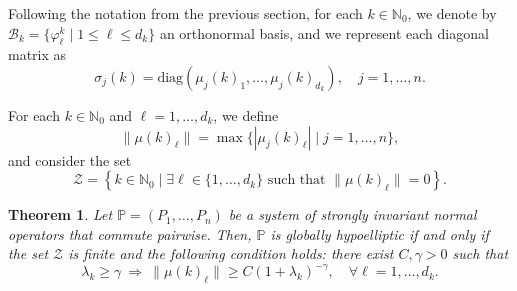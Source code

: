 \documentclass{amsart}
\newtheorem{theorem}{Theorem}[section]
\theoremstyle{definition}
\theoremstyle{remark}
\numberwithin{equation}{section}
\begin{document}
Following the notation from the previous section, for each $k\in\mathbb{N}_0$, we denote by $\mathcal{B}_k=\{\varphi_\ell^{k} \mid 1\leq \ell \leq d_k\}$ an orthonormal basis, and we represent each diagonal matrix as  
\begin{equation*}
	\sigma_j(k)= \text{diag}(\mu_j(k)_1,\dots,\mu_j(k)_{d_k}), \quad j=1,\ldots, n.
\end{equation*}

For each $k\in\mathbb{N}_0$ and $\ell=1,\dots,d_k$, we define  
\begin{equation*}
	\|\mu(k)_\ell\|=\max\{|\mu_j(k)_\ell| \mid j=1,\dots,n\},
\end{equation*}
and consider the set  
\begin{equation*}
	\mathcal{Z}=\left\{k\in\mathbb{N}_0 \mid \exists \ell\in\{1,\dots,d_k\} \text{ such that } \|\mu(k)_\ell\|=0\right\}.
\end{equation*}

	
	\begin{theorem}
		Let $\mathbb{P}=(P_1,\dots,P_n)$ be a system of strongly invariant normal operators that commute pairwise. Then, $\mathbb{P}$ is globally hypoelliptic if and only if the set $\mathcal{Z}$ is finite and the following condition holds: there exist $C,\gamma>0$ such that
		\begin{equation}\label{cond_comm}
			\lambda_k\geq\gamma\ \Rightarrow\ \|\mu(k)_\ell\|\geq C(1+\lambda_k)^{-\gamma},\quad \forall\ell=1,\dots,d_k.
		\end{equation}
	\end{theorem}
	
\end{document}
